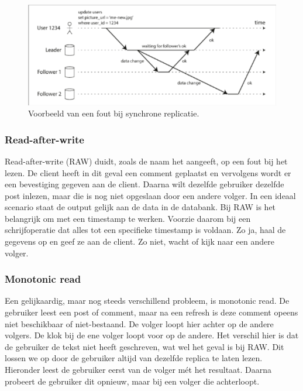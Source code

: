 \documentclass[a4paper,10pt,twoside]{report}
\begin{document}
\begin{figure}
	\includegraphics[width=\linewidth]{../images/Screenshot_160.png}
	\caption{Voorbeeld van een fout bij synchrone replicatie.}
\end{figure}


\subsubsection{Read-after-write}
Read-after-write (RAW) duidt, zoals de naam het aangeeft, op een fout bij het lezen. De client heeft in dit geval een comment geplaatst en vervolgens wordt er een bevestiging gegeven aan de client. Daarna wilt dezelfde gebruiker dezelfde post inlezen, maar die is nog niet opgeslaan door een andere volger. In een ideaal scenario staat de output gelijk aan de data in de databank. Bij RAW is het belangrijk om met een timestamp te werken. Voorzie daarom bij een schrijfoperatie dat alles tot een specifieke timestamp is voldaan. Zo ja, haal de gegevens op en geef ze aan de client. Zo niet, wacht of kijk naar een andere volger.

\subsubsection{Monotonic read}Een gelijkaardig, maar nog steeds verschillend probleem, is monotonic read. De gebruiker leest een post of comment, maar na een refresh is deze comment opeens niet beschikbaar of niet-bestaand. De volger loopt hier achter op de andere volgers. De klok bij de ene volger loopt voor op de andere. Het verschil hier is dat de gebruiker de tekst niet heeft geschreven, wat wel het geval is bij RAW. Dit lossen we op door de gebruiker altijd van dezelfde replica te laten lezen. Hieronder leest de gebruiker eerst van de volger mét het resultaat. Daarna probeert de gebruiker dit opnieuw, maar bij een volger die achterloopt.
\end{document}
